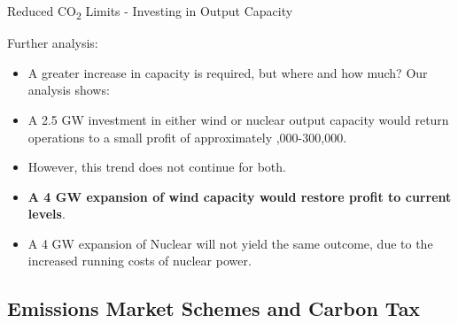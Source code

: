 \documentclass{beamer}
\begin{document}
    \begin{frame}{Reduced CO\textsubscript{2} Limits - Investing in Output Capacity}

              
               Further analysis:
              
                \begin{itemize}

                      \item A greater increase in capacity is required, but where and how much?  Our analysis shows:
                      
                      \pause
                      
                        \item A 2.5 GW investment in either wind or nuclear output capacity would return operations to a small profit of approximately ,000-300,000.

\item However, this trend does not continue for both.

	\pause

\item \textbf{A 4 GW expansion of wind capacity would restore profit to current levels}.

\item A 4 GW expansion of Nuclear will not yield the same outcome, due to the increased running costs of nuclear power.


                \end{itemize}
        
    \end{frame}
    
    
    
    
    \subsection{Emissions Market Schemes and Carbon Tax}
    
    
\end{document}

